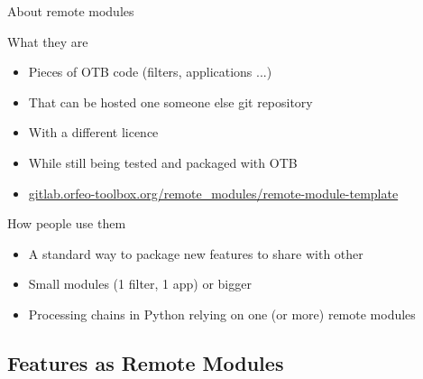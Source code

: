 \documentclass[8pt]{beamer}
\begin{document}
\begin{frame}{About remote modules}
\begin{block}{What they are}
  \begin{itemize}
    \item Pieces of OTB code (filters, applications ...)
    \item That can be hosted one someone else git repository
    \item With a different licence
    \item While still being tested and packaged with OTB
    \item \url{gitlab.orfeo-toolbox.org/remote_modules/remote-module-template}
  \end{itemize}
\end{block}

\begin{block}{How people use them}
  \begin{itemize}
    \item A standard way to package new features to share with other
    \item Small modules (1 filter, 1 app) or bigger
    \item Processing chains in Python relying on one (or more) remote modules
    \end{itemize}
\end{block}  
\end{frame}

\subsection{Features as Remote Modules}
\end{document}
